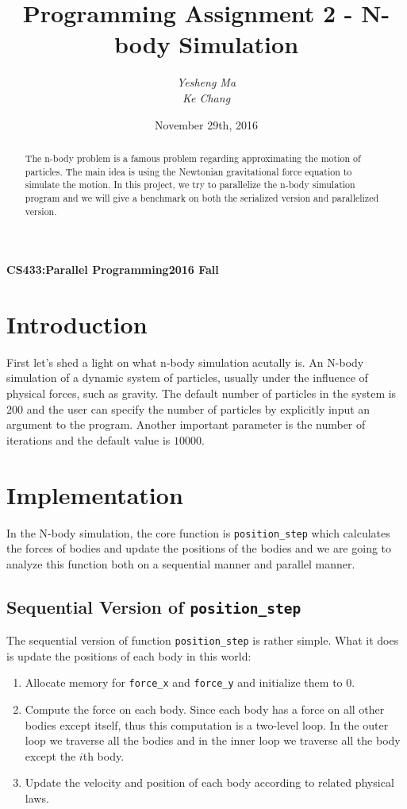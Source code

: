 \documentclass{article}
\begin{document}
\title{Programming Assignment 2 - N-body Simulation}
\author{\textit{Yesheng Ma}\\\textit{Ke Chang}}
\date{November 29th, 2016}
{\bf\small CS433:Parallel Programming}\hfill{\bf\small 2016 Fall}
{\let\newpage\relax\maketitle}
\maketitle


\begin{abstract}
	The n-body problem is a famous problem regarding approximating the motion of particles. The main idea is using the Newtonian gravitational force equation
	to simulate the motion. In this project, we try to parallelize the n-body simulation program and we will give a benchmark on both the serialized version
	and parallelized version.
\end{abstract}


\section{Introduction}
First let's shed a light on what n-body simulation acutally is. An N-body simulation of a dynamic system of particles, usually under the influence of physical
forces, such as gravity. The default number of particles in the system is $200$ and the user can specify the number of particles by explicitly input an argument
to	the program. Another important parameter is the number of iterations and the default value is $10000$.


\section{Implementation}
In the N-body simulation, the core function is \verb|position_step| which calculates the forces of bodies and update the positions of the bodies and 
we are going to analyze this function both on a sequential manner and parallel manner.

\subsection{Sequential Version of \texttt{position\_step}}
The sequential version of function \verb|position_step| is rather simple.
What it does is update the positions of each body in this world:
\begin{enumerate}
\item Allocate memory for \verb|force_x| and \verb|force_y| and initialize them to 0.
\item Compute the force on each body. Since each body has a force on all other bodies except itself, thus this computation is a two-level loop. In the outer loop we traverse all the bodies and in the inner loop we traverse all the body except the $i$th body.
\item Update the velocity and position of each body according to related physical laws.
\end{enumerate}
\end{document}
